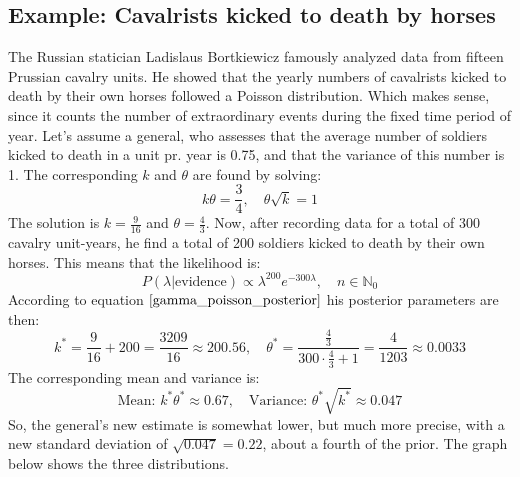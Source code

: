 \documentclass[12pt, a4paper]{article}
\begin{document}
\subsection{Example: Cavalrists kicked to death by horses}
The Russian statician Ladislaus Bortkiewicz famously analyzed data from fifteen Prussian cavalry units. He showed that the yearly numbers of cavalrists kicked to death by their own horses followed a Poisson distribution. Which makes sense, since it counts the number of extraordinary events during the fixed time period of year. Let's assume a general, who assesses that the average number of soldiers kicked to death in a unit pr. year is 0.75, and that the variance of this number is 1. The corresponding $k$ and $\theta$ are found by solving:
\begin{equation}
k\theta=\frac{3}{4},\quad\theta\sqrt{k}=1
\end{equation}
The solution is $k=\frac{9}{16}$ and $\theta=\frac{4}{3}$. Now, after recording data for a total of 300 cavalry unit-years, he find a total of 200 soldiers kicked to death by their own horses. This means that the likelihood is:
\begin{equation}
P(\lambda|\textrm{evidence})\propto\lambda^{200}e^{-300\lambda},\quad n\in\mathbb{N}_0
\end{equation}
According to equation $\ref{gamma_poisson_posterior}$ his posterior parameters are then:
\begin{equation}
k^*=\frac{9}{16}+200=\frac{3209}{16}\approx 200.56,\quad\theta^*=\frac{\frac{4}{3}}{300\cdot\frac{4}{3}+1}=\frac{4}{1203}\approx 0.0033
\end{equation}
The corresponding mean and variance is:
\begin{equation}
\textrm{Mean: }k^*\theta^*\approx0.67,\quad\textrm{Variance: }\theta^*\sqrt{k^*}\approx 0.047
\end{equation}
So, the general's new estimate is somewhat lower, but much more precise, with a new standard deviation of $\sqrt{0.047}=0.22$, about a fourth of the prior. The graph below shows the three distributions.

\end{document}
